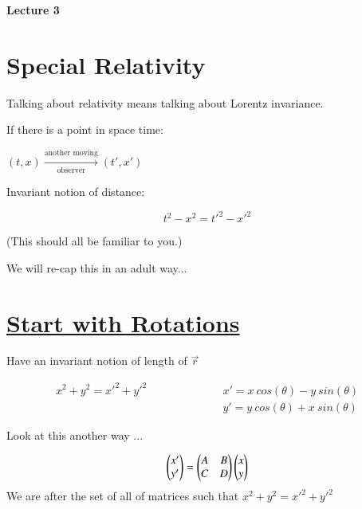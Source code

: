



\thispagestyle{fancy}

\begin{center}
{\huge \textbf{Lecture 3}}
\end{center}

{\fontsize{14}{16}\selectfont


\section*{Special Relativity}

Talking about relativity means talking about Lorentz invariance.

If there is a point in space time: \\
\begin{center}
$(t,x) \xrightarrow[\text{observer}]{\text{another moving}} (t', x')$
\end{center}

Invariant notion of distance:
 
\begin{equation*}
t^2 - x^2 = t'^2 - x'^2
\end{equation*}

(This should all be familiar to you.)

We will re-cap this in an adult way...

\section*{\underline{Start with Rotations}}

Have an invariant notion of length of $\vec{r}$

\begin{eqnarray*}
x^2 + y^2 = x'^2 + y'^2  \hspace{1in} & x' = x\ cos(\theta) - y\ sin(\theta) \\
                          &  y' = y\ cos(\theta) + x\ sin(\theta)
\end{eqnarray*}

Look at this another way ... 

\begin{equation*}
\begin{pmatrix} x' \\ y' \end{pmatrix} = \begin{pmatrix} A & B \\ C & D \end{pmatrix} \begin{pmatrix} x \\ y \end{pmatrix}  
\end{equation*}
We are after the set of all of matrices such that  $x^2 + y^2 = x'^2 + y'^2$

}
